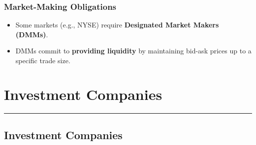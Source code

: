\documentclass[
  letterpaper,
  DIV=11,
  numbers=noendperiod]{scrartcl}
\providecommand{\tightlist}{%
  \setlength{\itemsep}{0pt}\setlength{\parskip}{0pt}}\usepackage{longtable,booktabs,array}
\begin{document}
\subsubsection{\texorpdfstring{\textbf{Market-Making
Obligations}}{Market-Making Obligations}}\label{market-making-obligations}

\begin{itemize}
\tightlist
\item
  Some markets (e.g., NYSE) require \textbf{Designated Market Makers
  (DMMs)}.
\item
  DMMs commit to \textbf{providing liquidity} by maintaining bid-ask
  prices up to a specific trade size.
\end{itemize}

\section{Investment Companies}\label{investment-companies}

\begin{center}\rule{0.5\linewidth}{0.5pt}\end{center}

\subsection{Investment Companies}\label{investment-companies-1}
\end{document}
